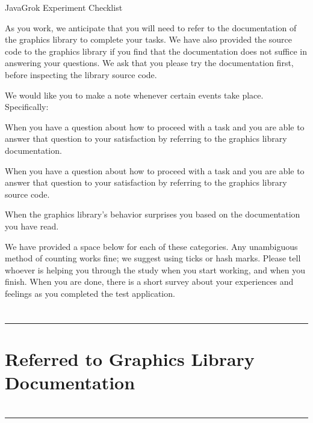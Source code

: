 \documentclass{article}
\let\Enumerate =\enumerate
\def\Nospacing{\itemsep=0pt\topsep=0pt\partopsep=0pt\parskip=0pt\parsep=0pt}
\renewenvironment{enumerate}{\Enumerate\Nospacing}{\endlist}
\begin{document}
\begin{center}
\LARGE JavaGrok Experiment Checklist
\end{center}

As you work, we anticipate that you will need to refer to the documentation of
the graphics library to complete your tasks. We have also provided the source
code to the graphics library if you find that the documentation does not
suffice in answering your questions. We ask that you please try the
documentation first, before inspecting the library source code.

We would like you to make a note whenever certain events take place.
Specifically:

\begin{enumerate}
\item When you have a question about how to proceed with a task and you are
  able to answer that question to your satisfaction by referring to the
  graphics library documentation.
\item When you have a question about how to proceed with a task and you are
  able to answer that question to your satisfaction by referring to the
  graphics library source code.
\item When the graphics library's behavior surprises you based on the
  documentation you have read.
\end{enumerate}

We have provided a space below for each of these categories.  Any unambiguous
method of counting works fine; we suggest using ticks or hash marks.  Please
tell whoever is helping you through the study when you start working, and when
you finish.  When you are done, there is a short survey about your experiences
and feelings as you completed the test application.
\section*{}

\hrule
\vspace{0.2in}
\section*{Referred to Graphics Library Documentation}

\section*{}
\section*{}
\hrule
\vspace{0.2in}
\end{document}
